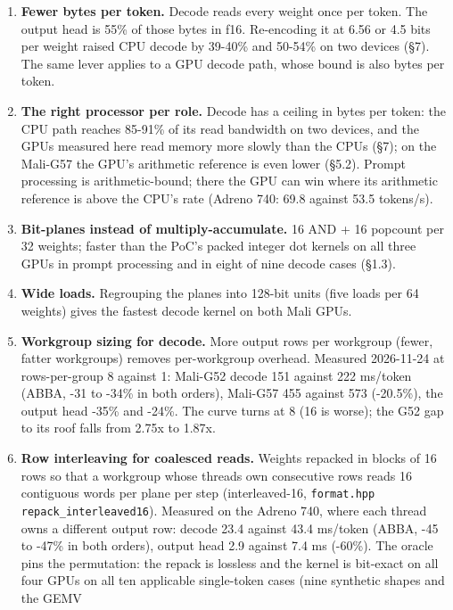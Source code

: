 \documentclass[
  10pt,
]{article}
\providecommand{\tightlist}{%
  \setlength{\itemsep}{0pt}\setlength{\parskip}{0pt}}
\begin{document}
\begin{enumerate}
\def\labelenumi{\arabic{enumi}.}
\tightlist%
\item
  \textbf{Fewer bytes per token.} Decode reads every weight once per
  token. The output head is 55\% of those bytes in f16. Re-encoding it
  at 6.56 or 4.5 bits per weight raised CPU decode by 39-40\% and
  50-54\% on two devices (\S{}7). The same lever applies to a GPU decode
  path, whose bound is also bytes per token.
\item
  \textbf{The right processor per role.} Decode has a ceiling in bytes
  per token: the CPU path reaches 85-91\% of its read bandwidth on two
  devices, and the GPUs measured here read memory more slowly than the
  CPUs (\S{}7); on the Mali-G57 the GPU's arithmetic reference is even
  lower (\S{}5.2). Prompt processing is arithmetic-bound; there the GPU
  can win where its arithmetic reference is above the CPU's rate (Adreno
  740: 69.8 against 53.5 tokens/s).
\item
  \textbf{Bit-planes instead of multiply-accumulate.} 16 AND + 16
  popcount per 32 weights; faster than the PoC's packed integer dot
  kernels on all three GPUs in prompt processing and in eight of nine
  decode cases (\S{}1.3).
\item
  \textbf{Wide loads.} Regrouping the planes into 128-bit units (five
  loads per 64 weights) gives the fastest decode kernel on both Mali
  GPUs.
\item
  \textbf{Workgroup sizing for decode.} More output rows per workgroup
  (fewer, fatter workgroups) removes per-workgroup overhead. Measured
  2026-11-24 at rows-per-group 8 against 1: Mali-G52 decode 151 against
  222 ms/token (ABBA, -31 to -34\% in both orders), Mali-G57 455 against
  573 (-20.5\%), the output head -35\% and -24\%. The curve turns at 8
  (16 is worse); the G52 gap to its roof falls from 2.75x to 1.87x.
\item
  \textbf{Row interleaving for coalesced reads.} Weights repacked in
  blocks of 16 rows so that a workgroup whose threads own consecutive
  rows reads 16 contiguous words per plane per step (interleaved-16,
  \texttt{format.hpp} \texttt{repack\_interleaved16}). Measured on the
  Adreno 740, where each thread owns a different output row: decode 23.4
  against 43.4 ms/token (ABBA, -45 to -47\% in both orders), output head
  2.9 against 7.4 ms (-60\%). The oracle pins the permutation: the
  repack is lossless and the kernel is bit-exact on all four GPUs on all
  ten applicable single-token cases (nine synthetic shapes and the GEMV

\end{enumerate}
\end{document}
